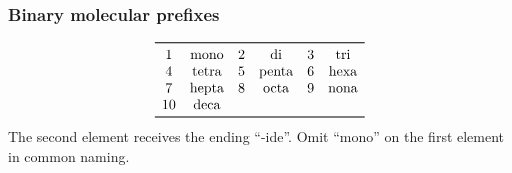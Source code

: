 \subsubsection{Binary molecular prefixes}
\[
\begin{array}{c c@{\quad}c c@{\quad}c c}
\toprule
1&\text{mono} & 2&\text{di} & 3&\text{tri}\\
4&\text{tetra} & 5&\text{penta} & 6&\text{hexa}\\
7&\text{hepta} & 8&\text{octa} & 9&\text{nona}\\
10&\text{deca} &&&\\
\bottomrule
\end{array}
\]
The second element receives the ending ``-ide''. Omit ``mono'' on the first element in common naming.
